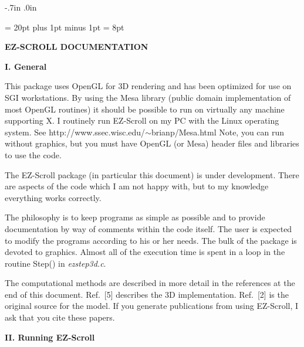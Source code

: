 % 


\textheight 9in  \textwidth 6.5in
\topmargin -.7in \oddsidemargin .0in


\baselineskip = 20pt plus 1pt minus 1pt
\parskip = 8pt
\parindent=0pt

\begin{center} 
{\bf EZ-SCROLL DOCUMENTATION} 
\end{center} 

\bigskip
{\bf I. General} 
\smallskip

This package uses OpenGL for 3D rendering and has been optimized for
use on SGI workstations.  By using the Mesa library (public domain
implementation of most OpenGL routines) it should be possible to run
on virtually any machine supporting X.  I routinely run EZ-Scroll on
my PC with the Linux operating system.  See
http://www.ssec.wisc.edu/$\sim$brianp/Mesa.html 
Note, you can run without graphics, but you must have OpenGL (or Mesa)
header files and libraries to use the code.

The EZ-Scroll package (in particular this document) is under
development.  There are aspects of the code which I am not happy with,
but to my knowledge everything works correctly.

The philosophy is to keep programs as simple as possible and to
provide documentation by way of comments within the code itself.  The
user is expected to modify the programs according to his or her needs.
The bulk of the package is devoted to graphics. Almost all of the
execution time is spent in a loop in the routine {\sf Step()} in {\em
ezstep3d.c}.

The computational methods are described in more detail in the
references at the end of this document.  Ref.~[5] describes the 3D
implementation.  Ref.~[2] is the original source for the model.  If
you generate publications from using EZ-Scroll, I ask that you cite
these papers.


\medskip
{\bf II. Running EZ-Scroll} 
\smallskip


